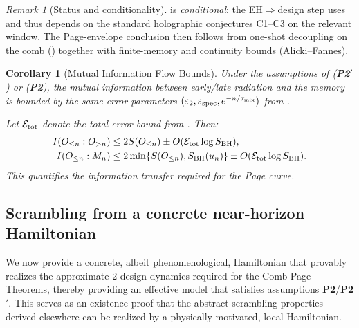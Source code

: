 \documentclass[aps,prd,preprint,onecolumn,superscriptaddress,nofootinbib,longbibliography,floatfix,11pt,showpacs,showkeys]{revtex4-2}
\newcommand{\Ptwo}{\textbf{P2}\xspace}
\newcommand{\PtwoPrime}{\textbf{P2$'$}\xspace}
\theoremstyle{plain}
\newtheorem{corollary}[theorem]{Corollary}
\theoremstyle{definition}
\theoremstyle{remark}
\newtheorem{remark}[theorem]{Remark}
\begin{document}
\begin{remark}[Status and conditionality]
 is \emph{conditional}: the EH$\Rightarrow$design step uses  and thus depends on the standard holographic conjectures C1--C3 on the relevant window.
The Page-envelope conclusion then follows from one-shot decoupling on the comb () together with finite-memory and continuity bounds (Alicki--Fannes).
\end{remark}

\begin{corollary}[Mutual Information Flow Bounds]
Under the assumptions of  (\PtwoPrime) or  (\Ptwo), the mutual information between early/late radiation and the memory is bounded by the same error parameters $(\varepsilon_2, \varepsilon_{\rm spec}, e^{-n/\tau_{\rm mix}})$ from .

Let $\mathcal{E}_{\rm tot}$ denote the total error bound from . Then:
\begin{align}
    I(O_{\le n} : O_{>n}) &\le 2 S(O_{\le n}) \pm O(\mathcal{E}_{\rm tot} \log S_{\rm BH}), \\
    I(O_{\le n} : M_n) &\le 2 \min\{S(O_{\le n}), S_{\rm BH}(u_n)\} \pm O(\mathcal{E}_{\rm tot} \log S_{\rm BH}).
\end{align}
This quantifies the information transfer required for the Page curve.
\end{corollary}

\subsection{Scrambling from a concrete near-horizon Hamiltonian}
\label{ssec:grav-scrambling}
We now provide a concrete, albeit phenomenological, Hamiltonian that provably realizes the approximate $2$-design dynamics required for the Comb Page Theorems, thereby providing an effective model that satisfies assumptions \Ptwo/\PtwoPrime.
This serves as an existence proof that the abstract scrambling properties derived elsewhere can be realized by a physically motivated, local Hamiltonian.
\end{document}
